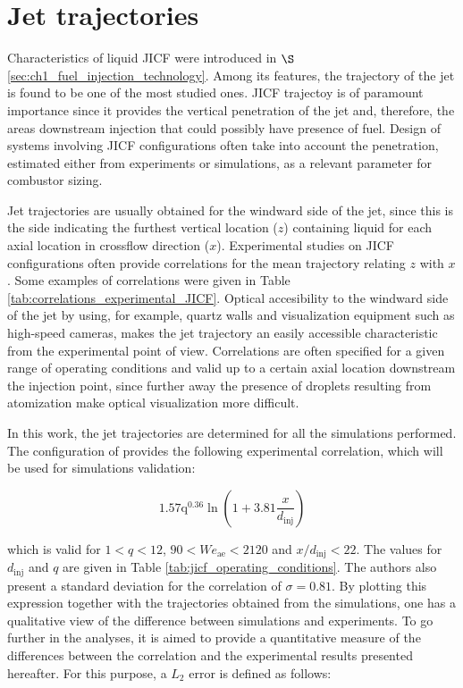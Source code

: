 \clearpage

\section{Jet trajectories}
\label{subsec:ch5_jet_trajectories_results}

Characteristics of liquid JICF were introduced in $\S$\ref{sec:ch1_fuel_injection_technology}. Among its features, the trajectory of the jet is found to be one of the most studied ones. JICF trajectoy is of paramount importance since it provides the vertical penetration of the jet and, therefore, the areas downstream injection that could possibly have presence of fuel. Design of systems involving JICF configurations often take into account the penetration, estimated either from experiments or simulations, as a relevant parameter for combustor sizing.

Jet trajectories are usually obtained for the windward side of the jet, since this is the side indicating the furthest vertical location ($z$) containing liquid for each axial location in crossflow direction ($x$). Experimental studies on JICF configurations often provide correlations for the mean trajectory relating $z$ with $x$. Some examples of correlations were given in Table \ref{tab:correlations_experimental_JICF}. Optical accesibility to the windward side of the jet by using, for example, quartz walls and visualization equipment such as high-speed cameras, makes the jet trajectory an easily accessible characteristic from the experimental point of view. Correlations are often specified for a given range of operating conditions and valid up to a certain axial location downstream the injection point, since further away the presence of droplets resulting from atomization make optical visualization more difficult.

In this work, the jet trajectories are determined for all the simulations performed. The configuration of  provides the following experimental correlation, which will be used for simulations validation:

\begin{equation}
1.57 \mathrm{q}^{0.36} \ln \left( 1 + 3.81 \frac{x}{d_\mathrm{inj}} \right)
\end{equation}

which is valid for $1 < q < 12$, $90 < We_\mathrm{ae} < 2120$ and $x/d_\mathrm{inj} < 22$. The values for $d_\mathrm{inj}$ and $q$ are given
in Table \ref{tab:jicf_operating_conditions}. The authors also present a standard deviation for the correlation of $\sigma = 0.81$. By plotting this expression together with the trajectories obtained from the simulations, one has a qualitative view of the difference between simulations and experiments. To go further in the analyses, it is aimed to provide a quantitative measure of the differences between the correlation and the experimental results presented hereafter. For this purpose, a $L_2$ error is defined as follows:

